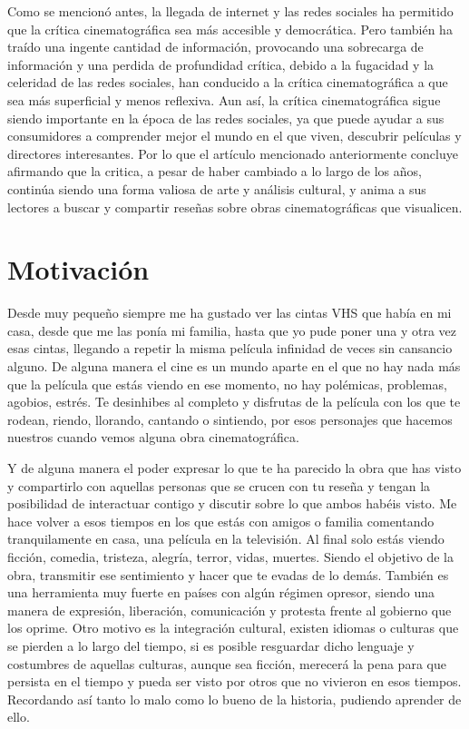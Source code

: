 Como se mencionó antes, la llegada de internet y las redes sociales ha permitido que la crítica 
cinematográfica sea más accesible y democrática. Pero también ha traído una ingente cantidad de 
información, provocando una sobrecarga de información y una perdida de profundidad crítica, debido a la 
fugacidad y la celeridad de las redes sociales, han conducido a la crítica cinematográfica a que sea 
más superficial y menos reflexiva. Aun así, la crítica cinematográfica sigue siendo importante en la 
época de las redes sociales, ya que puede ayudar a sus consumidores a comprender mejor el mundo en el 
que viven, descubrir películas y directores interesantes. Por lo que el artículo mencionado 
anteriormente concluye afirmando que la critica, a pesar de haber cambiado a lo largo de los años, 
continúa siendo una forma valiosa de arte y análisis cultural, y anima a sus lectores a buscar y 
compartir reseñas sobre obras cinematográficas que visualicen.

\section{Motivación}

Desde muy pequeño siempre me ha gustado ver las cintas VHS que había en mi casa, desde que me las ponía 
mi familia, hasta que yo pude poner una y otra vez esas cintas, llegando a repetir la misma película 
infinidad de veces sin cansancio alguno. De alguna manera el cine es un mundo aparte en el que no hay 
nada más que la película que estás viendo en ese momento, no hay polémicas, problemas, agobios, estrés. 
Te desinhibes al completo y disfrutas de la película con los que te rodean, riendo, llorando, cantando 
o sintiendo, por esos personajes que hacemos nuestros cuando vemos alguna obra cinematográfica. 

Y de alguna manera el poder expresar lo que te ha parecido la obra que has visto y compartirlo con 
aquellas personas que se crucen con tu reseña y tengan la posibilidad de interactuar contigo y discutir 
sobre lo que ambos habéis visto. Me hace volver a esos tiempos en los que estás con amigos o familia 
comentando tranquilamente en casa, una película en la televisión. Al final solo estás viendo ficción, 
comedia, tristeza, alegría, terror, vidas, muertes. Siendo el objetivo de la obra, transmitir ese 
sentimiento y hacer que te evadas de lo demás. También es una herramienta muy fuerte en países con 
algún régimen opresor, siendo una manera de expresión, liberación, comunicación y protesta frente al 
gobierno que los oprime. Otro motivo es la integración cultural, existen idiomas o culturas que se 
pierden a lo largo del tiempo, si es posible resguardar dicho lenguaje y costumbres de aquellas 
culturas, aunque sea ficción, merecerá la pena para que persista en el tiempo y pueda ser visto por 
otros que no vivieron en esos tiempos. Recordando así tanto lo malo como lo bueno de la historia, 
pudiendo aprender de ello.

